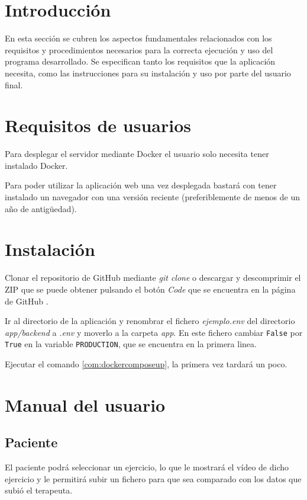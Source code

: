 
\section{Introducción}
En esta sección se cubren los aspectos fundamentales relacionados con los requisitos y procedimientos necesarios para la correcta ejecución y uso del programa desarrollado. Se especifican tanto los requisitos que la aplicación necesita, como las instrucciones para su instalación y uso por parte del usuario final.
\section{Requisitos de usuarios}
Para desplegar el servidor mediante Docker el usuario solo necesita tener instalado Docker.

Para poder utilizar la aplicación web una vez desplegada bastará con tener instalado un navegador con una versión reciente (preferiblemente de menos de un año de antigüedad).

\section{Instalación}

Clonar el repositorio de GitHub mediante \textit{git clone} o descargar y descomprimir el ZIP que se puede obtener pulsando el botón \textit{Code} que se encuentra en la página de GitHub \cite{repo}.

Ir al directorio de la aplicación y renombrar el fichero \textit{ejemplo.env} del directorio \textit{app/backend} a \textit{.env} y moverlo a la carpeta \textit{app}. En este fichero cambiar \texttt{False} por \texttt{True} en la variable \texttt{PRODUCTION}, que se encuentra en la primera linea.

Ejecutar el comando \ref{com:dockercomposeup}, la primera vez tardará un poco.


\section{Manual del usuario}

\subsection{Paciente}
El paciente podrá seleccionar un ejercicio, lo que le mostrará el vídeo de dicho ejercicio y le permitirá subir un fichero para que sea comparado con los datos que subió el terapeuta.
